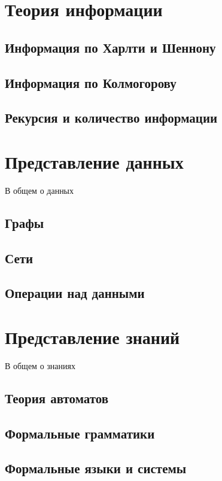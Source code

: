 \documentclass[b5paper,11pt]{book}
\begin{document}
	
	\chapter{Теория информации}
	
	\section{Информация по Харлти и Шеннону}
	\section{Информация по Колмогорову}
	\section{Рекурсия и количество информации}
	
	
	\chapter{Представление данных}
	В общем о данных
	
	\section{Графы}
	
	\section{Сети}
	
	\section{Операции над данными}
	
	\chapter{Представление знаний}
	В общем о знаниях
	
	\section{Теория автоматов}
	\section{Формальные грамматики}
	\section{Формальные языки и системы}
\end{document}
